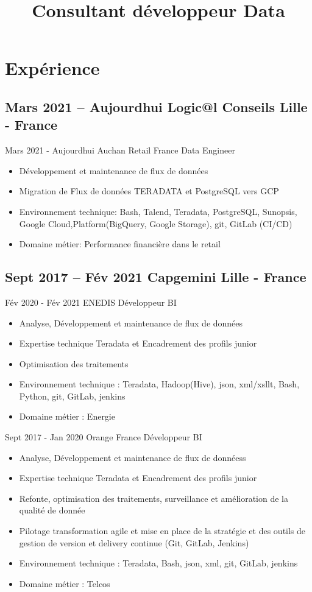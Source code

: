 \documentclass[10pt,legalpaper,oneside,roman]{moderncv}        %
\title{Consultant développeur Data}{}
\begin{document}
\makecvtitle
    
\section{Expérience}
\cvline{}{}
\subsection{Mars 2021 -- Aujourd\textquotesingle{}hui Logic@l Conseils Lille - France}
\cventry
{Mars 2021 - Aujourd\textquotesingle{}hui}
{Auchan Retail France}
{Data Engineer}
{}
{}
{}
{\begin{itemize}%
	\item Développement et maintenance de ﬂux de données 
	\item Migration de Flux de données TERADATA et PostgreSQL vers GCP
	\item Environnement technique: Bash, Talend, Teradata, PostgreSQL, Sunopsis, Google Cloud,Platform(BigQuery, Google Storage), git, GitLab (CI/CD)
	\item Domaine métier: Performance financière dans le retail  
	\end{itemize}}

\cvline {}{}
\subsection{Sept 2017 -- Fév 2021 Capgemini Lille - France}
\cventry
{Fév 2020 - Fév 2021} 
{ENEDIS}
{Développeur BI}
{}
{}
{}
{\begin{itemize}%
	\item Analyse, Développement et maintenance de ﬂux de données			\item Expertise technique Teradata et Encadrement des proﬁls junior
	\item Optimisation des traitements
	\item Environnement technique : Teradata, Hadoop(Hive), json, xml/xsllt, Bash, Python, git, GitLab, jenkins
	\item Domaine métier : Energie 
	\end{itemize}}
\cvline{}{}
\cventry
{Sept 2017 - Jan 2020 }
{Orange France}
{Développeur BI}
{}
{}
{}
{\begin{itemize}%
	\item Analyse, Développement et maintenance de ﬂux de donnéess
	\item Expertise technique Teradata et Encadrement des proﬁls junior
	\item Refonte, optimisation des traitements, surveillance et amélioration de la qualité de donnée
	\item Pilotage transformation agile et mise en place de la stratégie et des outils de gestion de version et delivery continue (Git, GitLab, Jenkins)
	\item Environnement technique : Teradata, Bash, json, xml, git, GitLab, jenkins
	\item Domaine métier : Telcos
	\end{itemize}}
\cvline{}{}
\end{document}
